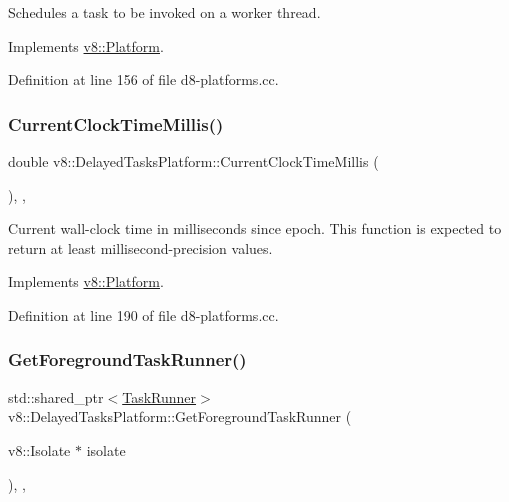 Schedules a task to be invoked on a worker thread. 

Implements \mbox{\hyperlink{classv8_1_1Platform_a92dc9c2f54c9a0fea87e15df8d58d699}{v8\+::\+Platform}}.



Definition at line 156 of file d8-\/platforms.\+cc.

\mbox{\label{classv8_1_1DelayedTasksPlatform_a12819f1b8581ce7a19f5a6eabae6c14c}} 
\subsubsection{\texorpdfstring{Current\+Clock\+Time\+Millis()}{CurrentClockTimeMillis()}}
{\footnotesize\ttfamily double v8\+::\+Delayed\+Tasks\+Platform\+::\+Current\+Clock\+Time\+Millis (\begin{DoxyParamCaption}{ }\end{DoxyParamCaption})\hspace{0.3cm}{\ttfamily [inline]}, {\ttfamily [override]}, {\ttfamily [virtual]}}

Current wall-\/clock time in milliseconds since epoch. This function is expected to return at least millisecond-\/precision values. 

Implements \mbox{\hyperlink{classv8_1_1Platform_a8aa46c7f8e492351ebe1bc8168ec9c2f}{v8\+::\+Platform}}.



Definition at line 190 of file d8-\/platforms.\+cc.

\mbox{\label{classv8_1_1DelayedTasksPlatform_a822079611fe0e01d3bc5dcf5eaa7f811}} 
\subsubsection{\texorpdfstring{Get\+Foreground\+Task\+Runner()}{GetForegroundTaskRunner()}}
{\footnotesize\ttfamily std\+::shared\+\_\+ptr$<$\mbox{\hyperlink{classv8_1_1TaskRunner}{Task\+Runner}}$>$ v8\+::\+Delayed\+Tasks\+Platform\+::\+Get\+Foreground\+Task\+Runner (\begin{DoxyParamCaption}\item[{v8\+::\+Isolate $\ast$}]{isolate }\end{DoxyParamCaption})\hspace{0.3cm}{\ttfamily [inline]}, {\ttfamily [override]}, {\ttfamily [virtual]}}

